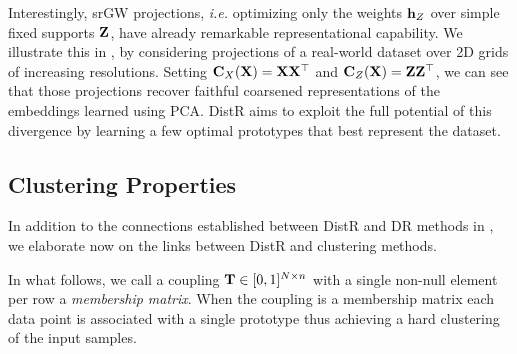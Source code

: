 Interestingly, srGW projections, \textit{i.e.} optimizing only the weights ${\mathbf{h}}_Z$ over simple fixed supports ${\mathbf{Z}}$, have already remarkable representational capability. We illustrate this in , by considering projections of a real-world dataset over 2D grids of increasing resolutions. Setting ${\mathbf{C}}_X({\mathbf{X}}) = {\mathbf{X}} {\mathbf{X}}^\top$ and ${\mathbf{C}}_Z({\mathbf{X}}) = {\mathbf{Z}} {\mathbf{Z}}^\top$, we can see that those projections recover faithful coarsened representations of the embeddings learned using PCA. DistR aims to exploit the full potential of this divergence by learning a few optimal prototypes that best represent the dataset.




\subsection{Clustering Properties \label{sec:clustering_properties}}

In addition to the connections established between DistR and DR methods in , we elaborate now on the links between DistR and clustering methods.%

In what follows, we call a coupling ${\mathbf{T}} \in [0,1]^{N \times n}$ with a single non-null element per row a \emph{membership matrix}. When the coupling is a membership matrix each data point is associated with a single prototype thus achieving a hard clustering of the input samples.






